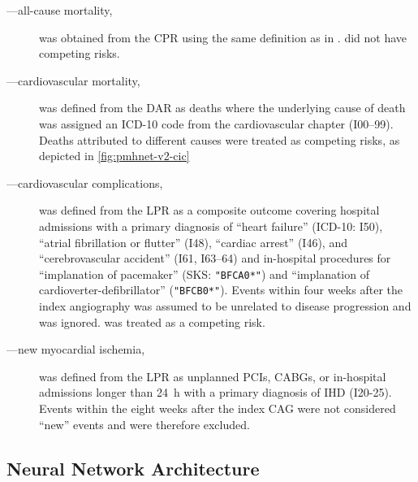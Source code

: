 \begin{description}
    \item[---all-cause mortality,]
        was obtained from the \ac{CPR}
        using the same definition as in \studyii{}.
         did not have competing risks.

    \item[---cardiovascular mortality,]
        was defined from the \ac{DAR} as deaths where the underlying
        cause of death was assigned an \ac{ICD-10} code from the 
        cardiovascular chapter (I00--99).
        Deaths attributed to different causes  were 
        treated as competing risks, as depicted in \cref{fig:pmhnet-v2-cic}

    \item[---cardiovascular complications,] 
        was defined from the \ac{LPR} as a composite outcome 
        covering hospital admissions with a primary diagnosis of
        \enquote{heart failure} (\acs{ICD-10}: I50),
        \enquote{atrial fibrillation or flutter} (I48),
        \enquote{cardiac arrest} (I46),
        and 
        \enquote{cerebrovascular accident} (I61, I63--64)
        and in-hospital procedures for 
        \enquote{implanation of pacemaker} (\acs{SKS}: \texttt{"BFCA0*"})
        and
        \enquote{implanation of cardioverter-defibrillator} (\texttt{"BFCB0*"}).
        Events within four weeks after the index angiography was assumed
        to be unrelated to disease progression and was ignored.
         was treated as a competing risk.

    \item[---new myocardial ischemia,] 
        was defined from the \ac{LPR} as 
        unplanned \acp{PCI}, \acp{CABG}, or 
        in-hospital admissions longer than \qty{24}{\hour}
        with a primary diagnosis of \ac{IHD} (I20-25).
        Events within the eight weeks after the index \ac{CAG} 
        were not considered \enquote{new} events 
        and were therefore excluded.
\end{description}

\subsection{Neural Network Architecture}

